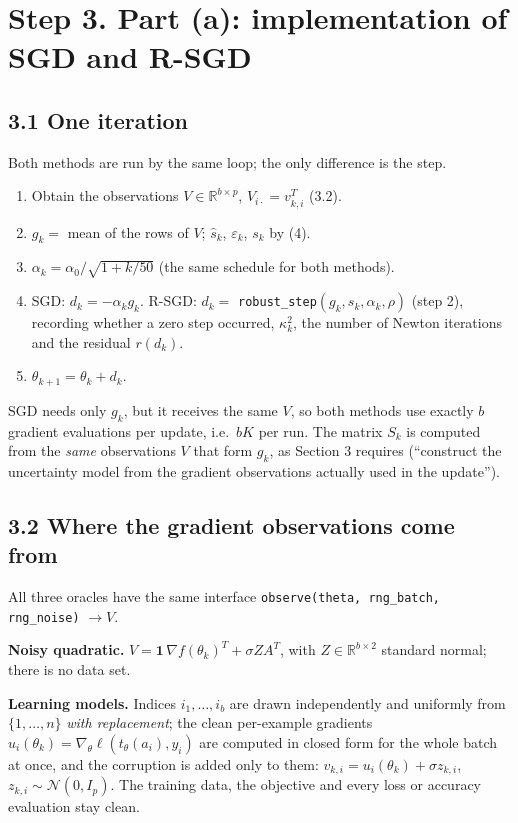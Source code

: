 \documentclass[11pt,a4paper]{article}
\begin{document}
\section*{Step 3. Part (a): implementation of SGD and R-SGD}

\subsection*{3.1 One iteration}

Both methods are run by the same loop; the only difference is the step.
\begin{enumerate}
\item Obtain the observations $V\in\mathbb R^{b\times p}$, $V_{i\cdot}=v_{k,i}^T$ (3.2).
\item $g_k=$ mean of the rows of $V$; $\widehat s_k$, $\varepsilon_k$, $s_k$ by (4).
\item $\alpha_k=\alpha_0/\sqrt{1+k/50}$ (the same schedule for both methods).
\item SGD: $d_k=-\alpha_kg_k$. R-SGD: $d_k=$ \texttt{robust\_step}$(g_k,s_k,\alpha_k,\rho)$
(step 2), recording whether a zero step occurred, $\kappa_k^2$, the number of Newton
iterations and the residual $r(d_k)$.
\item $\theta_{k+1}=\theta_k+d_k$.
\end{enumerate}
SGD needs only $g_k$, but it receives the same $V$, so both methods use exactly $b$
gradient evaluations per update, i.e.\ $bK$ per run. The matrix $S_k$ is computed from
the \emph{same} observations $V$ that form $g_k$, as Section 3 requires (``construct
the uncertainty model from the gradient observations actually used in the update'').

\subsection*{3.2 Where the gradient observations come from}

All three oracles have the same interface \texttt{observe(theta, rng\_batch,
rng\_noise)} $\to V$.

\textbf{Noisy quadratic.} $V=\mathbf 1\,\nabla f(\theta_k)^T+\sigma ZA^T$, with
$Z\in\mathbb R^{b\times2}$ standard normal; there is no data set.

\textbf{Learning models.} Indices $i_1,\dots,i_b$ are drawn independently and
uniformly from $\{1,\dots,n\}$ \emph{with replacement}; the clean per-example
gradients $u_{i}(\theta_k)=\nabla_\theta\ell(t_\theta(a_{i}),y_{i})$ are computed in
closed form for the whole batch at once, and the corruption is added only to them:
$v_{k,i}=u_{i}(\theta_k)+\sigma z_{k,i}$, $z_{k,i}\sim\mathcal N(0,I_p)$. The training
data, the objective and every loss or accuracy evaluation stay clean.
\end{document}
